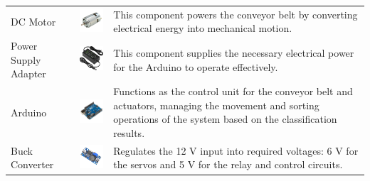 {\begin{longtable}{
		>{\centering\arraybackslash}m{3cm}  
		>{\centering\arraybackslash}m{4cm} 
		>{\arraybackslash}m{6cm}
	}
	\endfirsthead
	
	\midrule
	\endhead
	
	\bottomrule
	\endfoot
	
	DC Motor & \includegraphics[width=3cm]{figures/dc_motor} &
	This component powers the conveyor belt by converting electrical energy into mechanical motion. \\
	
	Power Supply Adapter & \includegraphics[width=3cm]{figures/adapter} &
	This component supplies the necessary electrical power for the Arduino to operate effectively. \\
	
	Arduino & \includegraphics[width=3cm]{figures/arduino} &
	Functions as the control unit for the conveyor belt and actuators, managing the movement and sorting operations of the system based on the classification results. \\
	
	Buck Converter & \includegraphics[width=3cm]{figures/buck_converter} &
	Regulates the 12 V input into required voltages: 6 V for the servos and 5 V for the relay and control circuits. \\
	

\end{longtable}}
